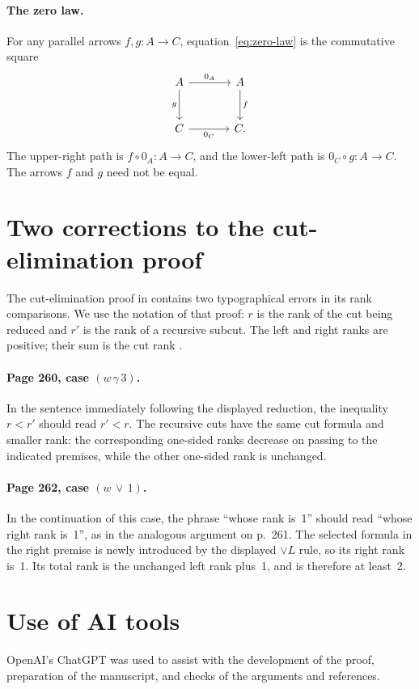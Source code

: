 \documentclass[11pt]{article}
\begin{document}
\paragraph{The zero law.}
For any parallel arrows $f,g:A\to C$,
equation~\eqref{eq:zero-law} is the commutative square
\[
\begin{tikzcd}[column sep=large,row sep=large]
 A\arrow[r,"0_A"]\arrow[d,"g"']&A\arrow[d,"f"]\\
 C\arrow[r,"0_C"']&C.
\end{tikzcd}
\]
The upper-right path is $f\circ0_A:A\to C$, and the lower-left
path is $0_C\circ g:A\to C$. The arrows $f$ and $g$ need not be equal.

\clearpage
\section{Two corrections to the cut-elimination proof}\label{app:cut-errata}

The cut-elimination proof in \cite[\S11.2]{DP} contains two
typographical errors in its rank comparisons. We use the notation of
that proof: $r$ is the rank of the cut being reduced and $r'$ is the
rank of a recursive subcut. The left and right ranks are positive;
their sum is the cut rank \cite[p.~249]{DP}.

\paragraph{Page 260, case $(w\,\gamma\,3)$.}
In the sentence immediately following the displayed reduction,
the inequality $r<r'$ should read $r'<r$.
The recursive cuts have the same cut formula and smaller rank:
the corresponding one-sided ranks decrease on passing to the
indicated premises, while the other one-sided rank is unchanged.

\paragraph{Page 262, case $(w\,\vee\,1)$.}
In the continuation of this case, the phrase ``whose rank is~1''
should read ``whose right rank is~1'', as in the analogous
argument on p.~261. The selected formula in the right premise
is newly introduced by the displayed $\vee L$ rule, so its right
rank is~1. Its total rank is the unchanged left rank plus~1,
and is therefore at least~2.

\section*{Use of AI tools}
OpenAI's ChatGPT was used to assist with the development of the proof,
preparation of the manuscript, and checks of the arguments and references.
\end{document}
